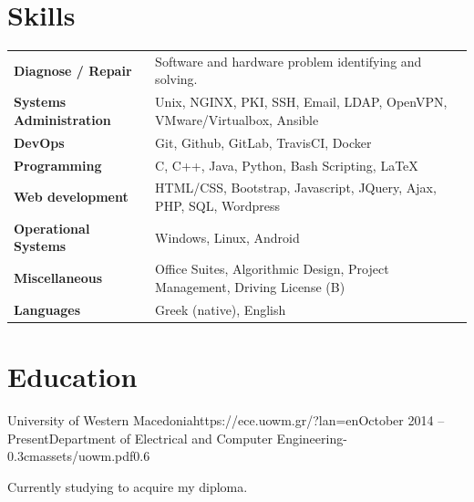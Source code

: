 \documentclass{mycv}
\begin{document}
	\section{Skills}
	\begin{tabular}{m{4.5cm} m{12.5cm}}
		\textbf{Diagnose / Repair}     	& Software and hardware problem identifying and solving. \\
		\textbf{Systems Administration}	& Unix, NGINX, PKI, SSH, Email, LDAP, OpenVPN, VMware/Virtualbox, Ansible \\
		\textbf{DevOps}	                & Git, Github, GitLab, TravisCI, Docker \\
		\textbf{Programming} 	 	   	& C, C++, Java, Python, Bash Scripting, \LaTeX \\
		\textbf{Web development}	   	& HTML/CSS, Bootstrap, Javascript, JQuery, Ajax, PHP, SQL, Wordpress \\
		\textbf{Operational Systems}   	& Windows, Linux, Android \\
		\textbf{Miscellaneous}         	& Office Suites, Algorithmic Design, Project Management, Driving License (B) \\
		\textbf{Languages} 			   	& Greek (native), English 
	\end{tabular}

	\section{Education}

	\begin{EntryDatedLogo}{University of Western Macedonia}{https://ece.uowm.gr/?lan=en}{October 2014 -- Present}{Department of Electrical and Computer Engineering}{-0.3cm}{assets/uowm.pdf}{0.6}
		\vspace{-0.2cm}
		\begin{Itemize}
			\item Currently studying to acquire my diploma.
		\end{Itemize}
	\end{EntryDatedLogo}
\end{document}
